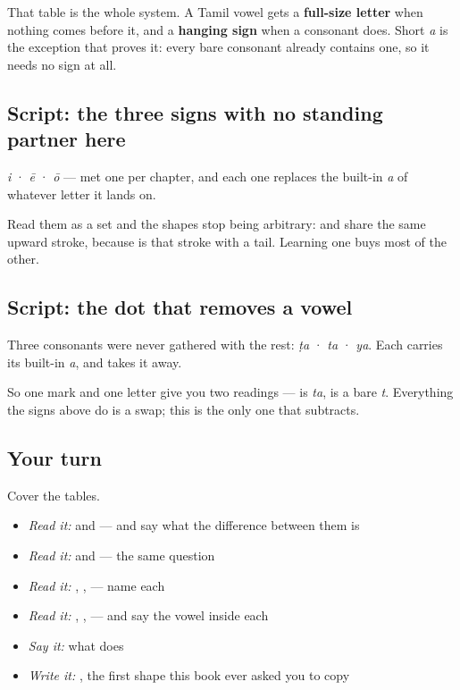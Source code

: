 That table is the whole system. A Tamil vowel gets a \textbf{full-size letter} when nothing comes before it, and a \textbf{hanging sign} when a consonant does. Short \emph{a} is the exception that proves it: every bare consonant already contains one, so it needs no sign at all.

\subsection*{Script: the three signs with no standing partner here}
\textbf{} \emph{i} · \textbf{} \emph{ē} · \textbf{} \emph{ō} — met one per chapter, and each one replaces the built-in \emph{a} of whatever letter it lands on.

Read them as a set and the shapes stop being arbitrary: \textbf{} and \textbf{} share the same upward stroke, because \textbf{} is that stroke with a tail. Learning one buys most of the other.

\subsection*{Script: the dot that removes a vowel}
Three consonants were never gathered with the rest: \textbf{} \emph{ṭa} · \textbf{} \emph{ta} · \textbf{} \emph{ya}. Each carries its built-in \emph{a}, and \textbf{} takes it away.

So one mark and one letter give you two readings — \textbf{} is \emph{ta}, \textbf{} is a bare \emph{t}. Everything the signs above do is a swap; this is the only one that subtracts.

\subsection*{Your turn}
Cover the tables.

\begin{itemize}
\raggedright
  \item \emph{Read it:} \textbf{} and \textbf{} — and say what the difference between them is
  \item \emph{Read it:} \textbf{} and \textbf{} — the same question
  \item \emph{Read it:} \textbf{}, \textbf{}, \textbf{} — name each
  \item \emph{Read it:} \textbf{}, \textbf{}, \textbf{} — and say the vowel inside each
  \item \emph{Say it:} what \textbf{} does
  \item \emph{Write it:} \textbf{}, the first shape this book ever asked you to copy
\end{itemize}

